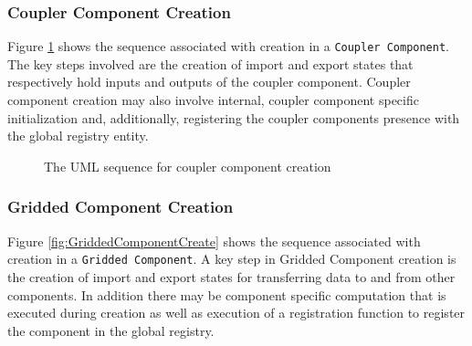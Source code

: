 \subsubsection{Coupler Component Creation}
Figure \ref{fig:CouplerComponentCreate} shows the sequence associated
with creation in a {\tt Coupler Component}. The key steps involved are
the creation of import and export states that respectively hold inputs and
outputs of the coupler component. Coupler component creation may also involve
internal, coupler component specific initialization and, additionally,
registering the coupler components presence with the global registry entity.

\begin{figure}
\caption[{Coupler Component Create}]
{The UML sequence for coupler component creation}
\begin{center}
\label{fig:CouplerComponentCreate}
\end{center}
\end{figure}

\subsubsection{Gridded Component Creation}
Figure \ref{fig:GriddedComponentCreate} shows the sequence associated with
creation in a {\tt Gridded Component}. A key step in Gridded Component
creation is the creation of import and export states for transferring 
data to and from other components. In addition there may be component
specific computation that is executed during creation as well as execution
of a registration function to register the component in the global registry.

